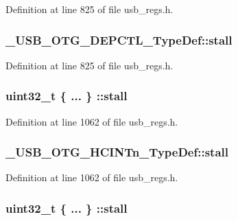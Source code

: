 Definition at line 825 of file usb\-\_\-regs.\-h.

\hypertarget{group___u_s_b___o_t_g___d_r_i_v_e_r_gac6602ddfb32c5671ed755b9b4feebb82}{
\subsubsection[{stall}]{ \-\_\-\-U\-S\-B\-\_\-\-O\-T\-G\-\_\-\-D\-E\-P\-C\-T\-L\-\_\-\-Type\-Def\-::stall}}\label{group___u_s_b___o_t_g___d_r_i_v_e_r_gac6602ddfb32c5671ed755b9b4feebb82}


Definition at line 825 of file usb\-\_\-regs.\-h.

\hypertarget{group___u_s_b___o_t_g___d_r_i_v_e_r_ga37f33e273b9d9100f7ad36b28cc8e3b8}{
\subsubsection[{stall}]{\setlength{\rightskip}{0pt plus 5cm}uint32\-\_\-t \{ ... \} \-::stall}}\label{group___u_s_b___o_t_g___d_r_i_v_e_r_ga37f33e273b9d9100f7ad36b28cc8e3b8}


Definition at line 1062 of file usb\-\_\-regs.\-h.

\hypertarget{group___u_s_b___o_t_g___d_r_i_v_e_r_ga5601dd5d1afdbc91a1d023e031f200a6}{
\subsubsection[{stall}]{ \-\_\-\-U\-S\-B\-\_\-\-O\-T\-G\-\_\-\-H\-C\-I\-N\-Tn\-\_\-\-Type\-Def\-::stall}}\label{group___u_s_b___o_t_g___d_r_i_v_e_r_ga5601dd5d1afdbc91a1d023e031f200a6}


Definition at line 1062 of file usb\-\_\-regs.\-h.

\hypertarget{group___u_s_b___o_t_g___d_r_i_v_e_r_gac0d9b28dd1ed6d74ca10dbd81f527961}{
\subsubsection[{stall}]{\setlength{\rightskip}{0pt plus 5cm}uint32\-\_\-t \{ ... \} \-::stall}}\label{group___u_s_b___o_t_g___d_r_i_v_e_r_gac0d9b28dd1ed6d74ca10dbd81f527961}


